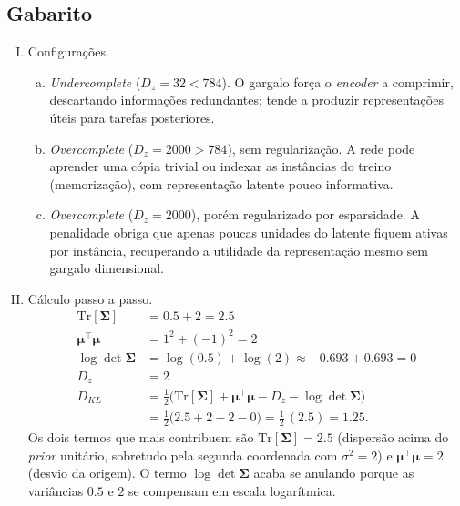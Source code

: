 \documentclass{dlproblemset}
\begin{document}
\subsection*{Gabarito}
\color{blue}
\begin{enumerate}[I)]

    \item Configurações.
    \begin{enumerate}[(a)]
        \item \emph{Undercomplete} ($D_z = 32 < 784$). O gargalo força o \textit{encoder} a comprimir, descartando informações redundantes; tende a produzir representações úteis para tarefas posteriores.
        \item \emph{Overcomplete} ($D_z = 2000 > 784$), sem regularização. A rede pode aprender uma cópia trivial ou indexar as instâncias do treino (memorização), com representação latente pouco informativa.
        \item \emph{Overcomplete} ($D_z = 2000$), porém regularizado por esparsidade. A penalidade obriga que apenas poucas unidades do latente fiquem ativas por instância, recuperando a utilidade da representação mesmo sem gargalo dimensional.
    \end{enumerate}

    \item Cálculo passo a passo.
    \begin{align*}
        \mathrm{Tr}[\boldsymbol{\Sigma}]   &= 0.5 + 2 = 2.5 \\
        \boldsymbol{\mu}^{\top}\boldsymbol{\mu}         &= 1^{2} + (-1)^{2} = 2 \\
        \log\det\boldsymbol{\Sigma}        &= \log(0.5) + \log(2) \approx -0.693 + 0.693 = 0 \\
        D_{z}                 &= 2 \\
        D_{KL} &= \tfrac{1}{2}\bigl(\mathrm{Tr}[\boldsymbol{\Sigma}] + \boldsymbol{\mu}^{\top}\boldsymbol{\mu} - D_z - \log\det\boldsymbol{\Sigma}\bigr) \\
               &= \tfrac{1}{2}\bigl(2.5 + 2 - 2 - 0\bigr) = \tfrac{1}{2}\,(2.5) = 1.25.
    \end{align*}
    Os dois termos que mais contribuem são $\mathrm{Tr}[\boldsymbol{\Sigma}] = 2.5$ (dispersão acima do \textit{prior} unitário, sobretudo pela segunda coordenada com $\sigma^{2} = 2$) e $\boldsymbol{\mu}^{\top}\boldsymbol{\mu} = 2$ (desvio da origem). O termo $\log\det\boldsymbol{\Sigma}$ acaba se anulando porque as variâncias $0.5$ e $2$ se compensam em escala logarítmica.


\end{enumerate}
\end{document}
